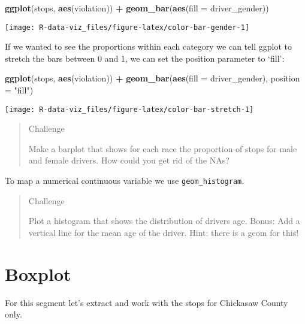 \documentclass[]{book}
\newenvironment{Shaded}{\begin{snugshade}}{\end{snugshade}}
\newcommand{\KeywordTok}[1]{\textcolor[rgb]{0.13,0.29,0.53}{\textbf{#1}}}
\newcommand{\DataTypeTok}[1]{\textcolor[rgb]{0.13,0.29,0.53}{#1}}
\newcommand{\StringTok}[1]{\textcolor[rgb]{0.31,0.60,0.02}{#1}}
\newcommand{\OperatorTok}[1]{\textcolor[rgb]{0.81,0.36,0.00}{\textbf{#1}}}
\newcommand{\NormalTok}[1]{#1}
\theoremstyle{definition}
\theoremstyle{definition}
\theoremstyle{definition}
\theoremstyle{remark}
\begin{document}
\begin{Shaded}
\begin{Highlighting}[]
\KeywordTok{ggplot}\NormalTok{(stops, }\KeywordTok{aes}\NormalTok{(violation)) }\OperatorTok{+}\StringTok{ }
\StringTok{  }\KeywordTok{geom_bar}\NormalTok{(}\KeywordTok{aes}\NormalTok{(}\DataTypeTok{fill =}\NormalTok{ driver_gender))}
\end{Highlighting}
\end{Shaded}

\texttt{[image: R-data-viz\_files/figure-latex/color-bar-gender-1]}

If we wanted to see the proportions within each category we can tell
ggplot to stretch the bars between 0 and 1, we can set the position
parameter to `fill':

\begin{Shaded}
\begin{Highlighting}[]
\KeywordTok{ggplot}\NormalTok{(stops, }\KeywordTok{aes}\NormalTok{(violation)) }\OperatorTok{+}\StringTok{ }
\StringTok{  }\KeywordTok{geom_bar}\NormalTok{(}\KeywordTok{aes}\NormalTok{(}\DataTypeTok{fill =}\NormalTok{ driver_gender), }\DataTypeTok{position =} \StringTok{"fill"}\NormalTok{)}
\end{Highlighting}
\end{Shaded}

\texttt{[image: R-data-viz\_files/figure-latex/color-bar-stretch-1]}

\begin{quote}
Challenge

Make a barplot that shows for each race the proportion of stops for male
and female drivers. How could you get rid of the NAs?
\end{quote}

To map a numerical continuous variable we use \texttt{geom\_histogram}.

\begin{quote}
Challenge

Plot a histogram that shows the distribution of drivers age. Bonus: Add
a vertical line for the mean age of the driver. Hint: there is a geom
for this!
\end{quote}

\section{Boxplot}\label{boxplot}

For this segment let's extract and work with the stops for Chickasaw
County only.
\end{document}
